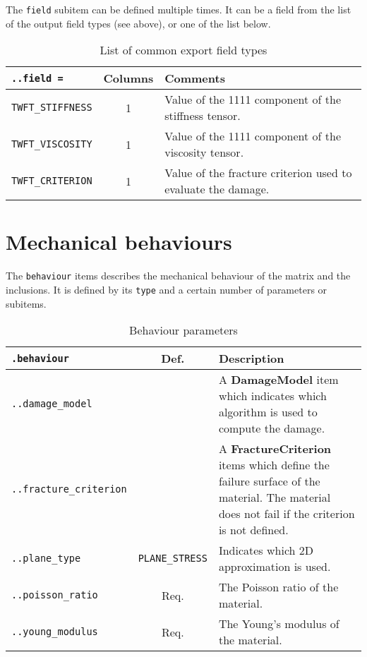 \documentclass[10pt]{article}
\begin{document}
\eject

The \verb+field+ subitem can be defined multiple times.
It can be a field from the list of the output field types (see above), or one of the list below.

\begin{table}[h!]
\begin{tabularx}{\textwidth}{lcX}
\verb+..field =+ & Columns & Comments\\
\hline
\verb+TWFT_STIFFNESS+ & 1 &  Value of the 1111 component of the stiffness tensor.\\	
\verb+TWFT_VISCOSITY+ & 1 &  Value of the 1111 component of the viscosity tensor.\\	
\verb+TWFT_CRITERION+ & 1 &  Value of the fracture criterion used to evaluate the damage.\\	
\hline
\end{tabularx}
\caption{List of common export field types}
\end{table}

\section{Mechanical behaviours}

The \verb+behaviour+ items describes the mechanical behaviour of the matrix and the inclusions.
It is defined by its \verb+type+ and a certain number of parameters or subitems.

\begin{table}[h!]
\begin{tabularx}{\textwidth}{lcX}
\verb+.behaviour+ & Def. & Description\\
\hline
\verb+..damage_model+ &   & A \textbf{DamageModel} item which indicates which algorithm is used to compute the damage.\\	
\verb+..fracture_criterion+ &   & A \textbf{FractureCriterion} items which define the failure surface of the material. The material does not fail if the criterion is not defined.\\	
\verb+..plane_type+ & \verb+PLANE_STRESS+ & Indicates which 2D approximation is used.\\
\verb+..poisson_ratio+ & Req. & The Poisson ratio of the material.\\
\verb+..young_modulus+ & Req. & The Young's modulus of the material.\\
\hline
\end{tabularx}
\caption{Behaviour parameters}
\end{table}
\end{document}
